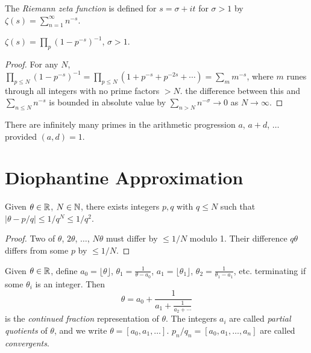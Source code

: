 \documentclass[a4paper, 10pt]{amsart}
\begin{document}
\begin{definition}
    The \emph{Riemann zeta function} is defined for $s = \sigma + it$ for $\sigma > 1$ by
        $\zeta(s) = \sum_{n = 1}^\infty n^{-s}$.
\end{definition}

\begin{theorem}
$\zeta(s) = \prod_p (1 - p^{-s})^{-1}$, $\sigma > 1$.
\end{theorem}
\begin{proof}
    For any $N$, $\prod_{p \leq N} (1 - p^{-s})^{-1} = \prod_{p \leq N} (1 + p^{-s}+ p^{-2s} + \cdots) = \sum_m m^{-s}$, where $m$ runes through all integers with no prime factors $> N$. the difference between this and $\sum_{n \leq N} n^{-s}$ is bounded in absolute value by $\sum_{n > N} n^{-\sigma} \rightarrow 0$ as $N \rightarrow \infty$.
\end{proof}

\begin{theorem}
There are infinitely many primes in the arithmetic progression $a$, $a + d$, $\dots$ provided $(a, d) = 1$.   
\end{theorem}

\section{Diophantine Approximation}

\begin{theorem}[Dirichlet]
Given $\theta \in \mathbb{R}$, $N \in \mathbb{N}$, there exists integers $p, q$ with $q \leq N$ such that $|\theta - p/q| \leq 1/q^N \leq 1/q^2$.
\end{theorem}
\begin{proof}
    Two of $\theta$, $2\theta$, $\dots$, $N\theta$ must differ by $\leq 1/N$ modulo 1. Their difference $q \theta$ differs from some $p$ by $\leq 1/N$.
\end{proof}

\begin{definition}
    Given $\theta \in \mathbb{R}$, define $a_0 = \lfloor \theta \rfloor$, $\theta_1 = \frac{1}{\theta - a_0}$, $a_1 = \lfloor \theta_1 \rfloor$, $\theta_2 = \frac{1}{\theta_1 - a_1}$, etc. terminating if some $\theta_i$ is an integer. Then
    $$
    \theta = a_0 + \frac{1}{a_1 + \frac{1}{a_2 +\cdots}}
    $$
    is the \emph{continued fraction} representation of $\theta$. The integers $a_i$ are called \emph{partial quotients} of $\theta$, and we write $\theta = [a_0, a_1, \dots]$. $p_n/q_n = [a_0, a_1, \dots, a_n]$ are called \emph{convergents}.
\end{definition}
\end{document}
